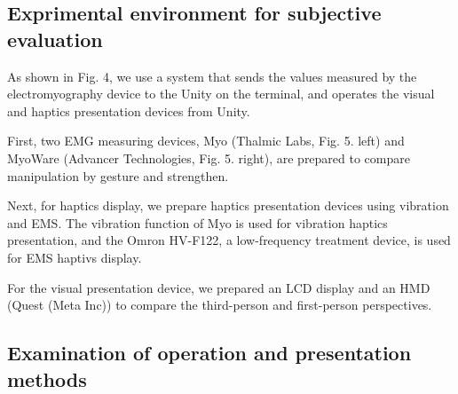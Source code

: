 \documentclass[letterpaper, 10 pt, conference]{ieeeconf}  %
\begin{document}
        \subsection{Exprimental environment for subjective evaluation}
                As shown in Fig. 4, we use a system that sends the values measured by the electromyography device to the Unity on the terminal, and operates the visual and haptics presentation devices from Unity.  

                First, two EMG measuring devices, Myo (Thalmic Labs, Fig. 5. left) and MyoWare (Advancer Technologies, Fig. 5. right), are prepared to compare manipulation by gesture and strengthen.  

                Next, for haptics display, we prepare haptics presentation devices using vibration and EMS.  
                The vibration function of Myo is used for vibration haptics presentation, and the Omron HV-F122, a low-frequency treatment device, is used for EMS haptivs display.  

                For the visual presentation device, we prepared an LCD display and an HMD (Quest (Meta Inc)) to compare the third-person and first-person perspectives.

        \subsection{Examination of operation and presentation methods}
                \begin{table}[tb]
                        \begin{center}
                        \caption{Comparison items}
                        \end{center}
                \end{table}
\end{document}
